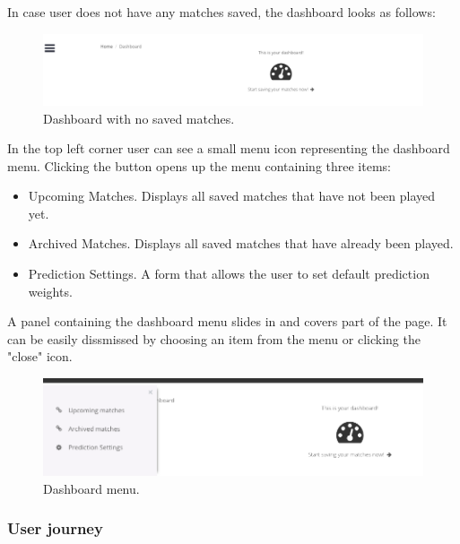 In case user does not have any matches saved, the dashboard looks as follows:

\begin{figure}[H]
	\begin{center}
		\includegraphics[width=.90\linewidth,natwidth=610,natheight=642]{impl/images/noSavedMatches}
		\caption{Dashboard with no saved matches.} \label{fig:using: nosavedmatches}
	\end{center}
\end{figure}


In the top left corner user can see a small menu icon representing the dashboard menu. Clicking the button opens up the menu containing three items:

\begin{itemize}
	\item{Upcoming Matches. Displays all saved matches that have not been played yet. }
	\item{Archived Matches. Displays all saved matches that have already been played.}
	\item{Prediction Settings. A form that allows the user to set default prediction weights.}
\end{itemize}

A panel containing the dashboard menu slides in and covers part of the page. It can be easily dissmissed by choosing an item from the menu or clicking the "close" icon.

\begin{figure}[H]
	\begin{center}
		\includegraphics[width=.90\linewidth,natwidth=610,natheight=642]{impl/images/dashboardMenu}
		\caption{Dashboard menu.} \label{fig:using: dashboardmenu}
	\end{center}
\end{figure}

\subsubsection*{User journey}
\label{subsec:dashboarduserjourney}


